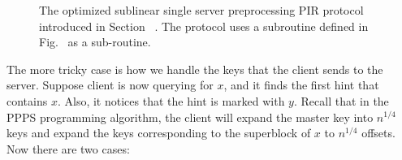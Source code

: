 \begin{figure}[p]
\begin{minipage}{\textwidth}
\begin{mdframed}
\begin{enumerate}[leftmargin=5mm,itemsep=1pt]
            \end{enumerate}
        \end{mdframed}
    \end{minipage}
    \caption{The optimized sublinear single server preprocessing PIR protocol
    introduced in Section ~. The protocol uses
    a subroutine defined in Fig.~ as a
    sub-routine.}
    \label{fig:optimized:single-server}
\end{figure}


The more tricky case is how we handle the keys that the client sends to the
server. Suppose client is now querying for $x$, and it finds the first hint that
contains $x$. Also, it notices that the hint is marked with $y$. Recall that in
the PPPS programming algorithm, the client will expand the master key into
$n^{1/4}$ keys and expand the keys corresponding to the superblock of $x$ to
$n^{1/4}$ offsets. Now there are two cases:
